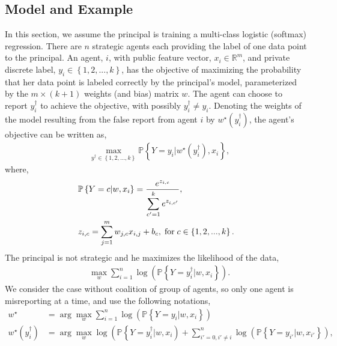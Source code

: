 \documentclass{article}
\begin{document}
\subsection{Model and Example}
In this section, we assume the principal is training a multi-class logistic (softmax) regression. There are $n $ strategic agents each providing the label of one data point to the principal. An agent, $i $, with public feature vector, $x_{i} \in \mathbb{R}^{m}$, and private discrete label, $y_{i} \in \left\{1, 2, ..., k \right\}$, has the objective of maximizing the probability that her data point is labeled correctly by the principal's model, parameterized by the $m  \times \left(k  + 1\right)$ weights (and bias) matrix $w $. The agent can choose to report $y^{\dagger}_{i}$ to achieve the objective, with possibly $y^{\dagger}_{i} \neq  y_{i}$. Denoting the weights of the model resulting from the false report from agent $i $ by $w^\star \left(y^{\dagger}_{i}\right)$, the agent's objective can be written as,
\begin{align*}
&  \displaystyle\max_{y^{\dagger} \in \left\{1, 2, ..., k \right\}} \mathbb{P}\left\{Y = y_{i} | w^\star \left(y^{\dagger}_{i}\right), x_{i}\right\},
\end{align*}
where,
\begin{align*}
&  \mathbb{P}\left\{Y = c | w, x_{i}\right\} = \dfrac{e^{z_{i,c}}}{\displaystyle\sum_{c'=1}^{k} e^{z_{i,c'}}},
\\ &  z_{i,c} = \displaystyle\sum_{j=1}^{m} w_{j,c} x_{i,j} + b_{c} , \text{\;for\;} c \in \left\{1, 2, ..., k\right\}.
\end{align*}
The principal is not strategic and he maximizes the likelihood of the data,
\begin{align*}
&\displaystyle\max_{w} \displaystyle\sum_{i=1}^{n} \log\left(\mathbb{P}\left\{Y = y^{\dagger}_{i} | w, x_{i}\right\}\right).
\end{align*}
We consider the case without coalition of group of agents, so only one agent is misreporting at a time, and use the following notations,
\begin{align*}
w^\star  &= \arg\displaystyle\max_{w} \displaystyle\sum_{i=1}^{n} \log\left(\mathbb{P}\left\{Y = y_{i} | w, x_{i}\right\}\right)
\\ w^\star \left(y^{\dagger}_{i}\right) &= \arg\displaystyle\max_{w} \log\left(\mathbb{P}\left\{Y = y^{\dagger}_{i} | w, x_{i}\right) + \displaystyle\sum_{i' = 0, i' \neq  i}^{n} \log\left(\mathbb{P}\left\{Y = y_{i'} | w, x_{i'}\right\}\right),\right.
\end{align*}
\end{document}

